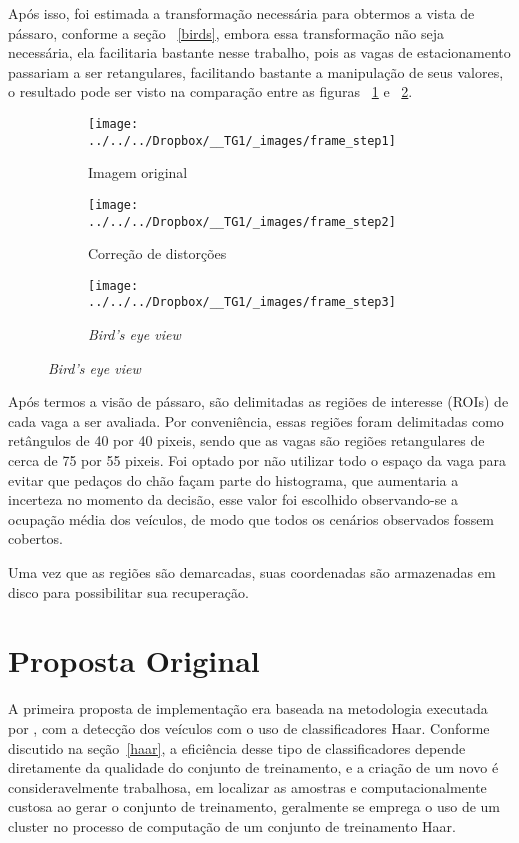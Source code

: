 \documentclass[ecp,tc]{iiufrgs}
\begin{document}
Após isso, foi estimada a transformação necessária para obtermos a vista de pássaro, conforme a seção ~\ref{birds}, embora essa transformação não seja necessária, ela facilitaria bastante nesse trabalho, pois as vagas de estacionamento passariam a ser retangulares, facilitando bastante a manipulação de seus valores, o resultado pode ser visto na comparação entre as figuras ~\ref{fig:frame1} e ~\ref{fig:frame2}.

\begin{figure}
	\centering
	\caption{Transformações aplicadas na imagem}
	\begin{subfigure}[b]{0.3\textwidth}
		\texttt{[image: ../../../Dropbox/\_\_TG1/\_images/frame\_step1]}
		\caption{Imagem original}
		\label{fig:frame1}
	\end{subfigure}
	\quad
	\begin{subfigure}[b]{0.3\textwidth}
		\texttt{[image: ../../../Dropbox/\_\_TG1/\_images/frame\_step2]}
		\caption{Correção de distorções}
		\label{fig:frame2}
	\end{subfigure}
	\quad
	\begin{subfigure}[b]{0.3\textwidth}
		\texttt{[image: ../../../Dropbox/\_\_TG1/\_images/frame\_step3]}
		\caption{\textit{Bird's eye view}}
		\label{fig:frame3}
	\end{subfigure}
	\label{fig:frame}
\end{figure}



Após termos a visão de pássaro, são delimitadas as regiões de interesse (ROIs) de cada vaga a ser avaliada. Por conveniência, essas regiões foram delimitadas como retângulos de 40 por 40 pixeis, sendo que as vagas são regiões retangulares de cerca de 75 por 55 pixeis. Foi optado por não utilizar todo o espaço da vaga para evitar que pedaços do chão façam parte do histograma, que aumentaria a incerteza no momento da decisão, esse valor foi escolhido observando-se a ocupação média dos veículos, de modo que todos os cenários observados fossem cobertos.

Uma vez que as regiões são demarcadas, suas coordenadas são armazenadas em disco para possibilitar sua recuperação.

\section{Proposta Original}

A primeira proposta de implementação era baseada na metodologia executada por , com a detecção dos veículos com o uso de classificadores Haar. Conforme discutido na seção~\ref{haar}, a eficiência desse tipo de classificadores depende diretamente da qualidade do conjunto de treinamento, e a criação de um novo é consideravelmente trabalhosa, em localizar as amostras e computacionalmente custosa ao gerar o conjunto de treinamento, geralmente se emprega o uso de um cluster no processo de computação de um conjunto de treinamento Haar.
\end{document}
